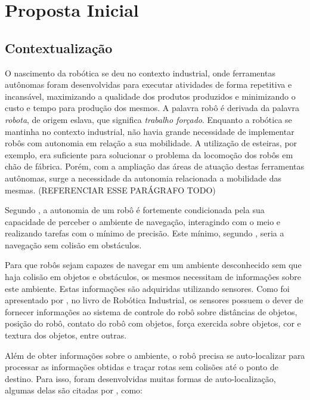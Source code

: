 
\chapter[Proposta Inicial]{Proposta Inicial}

\section{Contextualização}
	
	O nascimento da robótica se deu no contexto industrial, onde ferramentas autônomas foram desenvolvidas para executar atividades de forma repetitiva e incansável, maximizando a qualidade dos produtos produzidos e minimizando o custo e tempo para produção dos mesmos. A palavra robô é derivada da palavra \textit{robota}, de origem eslava, que significa \textit{trabalho forçado}. Enquanto a robótica se mantinha no contexto industrial, não havia grande necessidade de implementar robôs com autonomia em relação a sua mobilidade. A utilização de esteiras, por exemplo, era suficiente para solucionar o problema da locomoção dos robôs em chão de fábrica. Porém, com a ampliação das áreas de atuação destas ferramentas autônomas, surge a necessidade da autonomia relacionada a mobilidade das mesmas. (REFERENCIAR ESSE PARÁGRAFO TODO)

	Segundo \cite{localizacaoEMapeamentoPaulo}, a autonomia de um robô é fortemente condicionada pela sua capacidade de perceber o ambiente de navegação, interagindo com o meio e realizando tarefas com o mínimo de precisão. Este mínimo, segundo \cite{localizacaoEMapeamentoPaulo}, seria a navegação sem colisão em obstáculos. 

	Para que robôs sejam capazes de navegar em um ambiente desconhecido sem que haja colisão em objetos e obstáculos, os mesmos necessitam de informações sobre este ambiente. Estas informações são adquiridas utilizando sensores. Como foi apresentado por \cite{interacaoRoboAmbiente}, no livro de Robótica Industrial, os sensores possuem o dever de fornecer informações ao sistema de controle do robô sobre distâncias de objetos, posição do robô, contato do robô com objetos, força exercida sobre objetos, cor e textura dos objetos, entre outras.

	Além de obter informações sobre o ambiente, o robô precisa se auto-localizar para processar as informações obtidas e traçar rotas sem colisões até o ponto de destino. Para isso, foram desenvolvidas muitas formas de auto-localização, algumas delas são citadas por \cite{roboBulldozerIV}, como:

